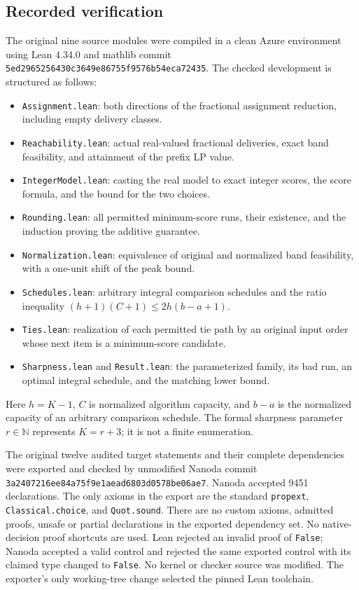 \documentclass[11pt]{article}
\begin{document}
\subsection*{Recorded verification}
The original nine source modules were compiled in a clean Azure environment using Lean
4.34.0 and mathlib commit
\texttt{5ed2965256430c3649e86755f9576b54eca72435}.
The checked development is structured as follows:
\begin{itemize}
\item \texttt{Assignment.lean}: both directions of the fractional assignment
reduction, including empty delivery classes.
\item \texttt{Reachability.lean}: actual real-valued fractional deliveries,
exact band feasibility, and attainment of the prefix LP value.
\item \texttt{IntegerModel.lean}: casting the real model to exact integer
scores, the score formula, and the bound for the two choices.
\item \texttt{Rounding.lean}: all permitted minimum-score runs, their
existence, and the induction proving the additive guarantee.
\item \texttt{Normalization.lean}: equivalence of original and normalized
band feasibility, with a one-unit shift of the peak bound.
\item \texttt{Schedules.lean}: arbitrary integral comparison schedules and
the ratio inequality $(h+1)(C+1)\le2h(b-a+1)$.
\item \texttt{Ties.lean}: realization of each permitted tie path by an
original input order whose next item is a minimum-score candidate.
\item \texttt{Sharpness.lean} and \texttt{Result.lean}: the parameterized
family, its bad run, an optimal integral schedule, and the matching lower bound.
\end{itemize}
Here $h=K-1$, $C$ is normalized algorithm capacity, and $b-a$ is the normalized
capacity of an arbitrary comparison schedule. The formal sharpness parameter
$r\in\mathbb N$ represents $K=r+3$; it is not a finite enumeration.

The original twelve audited target statements and their complete dependencies were
exported and checked by unmodified Nanoda commit
\texttt{3a2407216ee84a75f9e1aead6803d0578be06ae7}.
Nanoda accepted 9451 declarations. The only axioms in the export are the
standard \texttt{propext}, \texttt{Classical.choice}, and \texttt{Quot.sound}.
There are no custom axioms, admitted proofs, unsafe or partial declarations
in the exported dependency set. No native-decision proof shortcuts are used.
Lean rejected an invalid proof of \texttt{False}; Nanoda accepted a valid
control and rejected the same exported control with its claimed type changed
to \texttt{False}. No kernel or checker source was modified. The exporter's
only working-tree change selected the pinned Lean toolchain.
\end{document}

